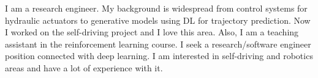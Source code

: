 I am a research engineer. My background is widespread from control systems for hydraulic actuators to generative models using DL for trajectory prediction. Now I worked on the self-driving project and I love this area. Also, I am a teaching assistant in the reinforcement learning course. I seek a research/software engineer position connected with deep learning. I am interested in self-driving and robotics areas and have a lot of experience with it.
